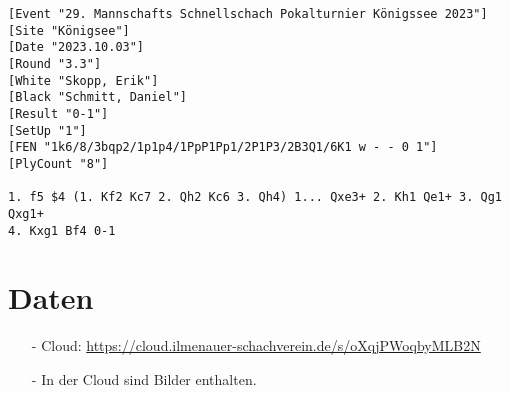 \documentclass[a4paper,german]{tui-algo-seminar}
\begin{document}
\begin{verbatim}
[Event "29. Mannschafts Schnellschach Pokalturnier Königssee 2023"]
[Site "Königsee"]
[Date "2023.10.03"]
[Round "3.3"]
[White "Skopp, Erik"]
[Black "Schmitt, Daniel"]
[Result "0-1"]
[SetUp "1"]
[FEN "1k6/8/3bqp2/1p1p4/1PpP1Pp1/2P1P3/2B3Q1/6K1 w - - 0 1"]
[PlyCount "8"]

1. f5 $4 (1. Kf2 Kc7 2. Qh2 Kc6 3. Qh4) 1... Qxe3+ 2. Kh1 Qe1+ 3. Qg1 Qxg1+ 
4. Kxg1 Bf4 0-1
\end{verbatim}


\section{Daten}
\begin{itemize}
    \item[-] Cloud: \url{https://cloud.ilmenauer-schachverein.de/s/oXqjPWoqbyMLB2N}
    \item[-] In der Cloud sind Bilder enthalten.
\end{itemize}
\end{document}
